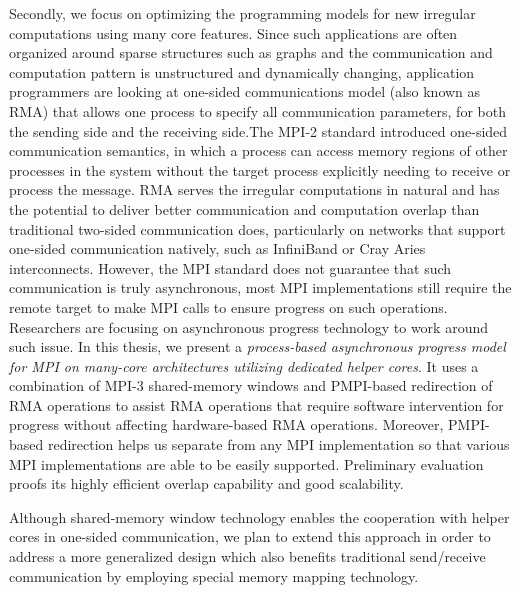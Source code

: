 Secondly, we focus on optimizing the programming models for new irregular 
computations using many core features. Since such applications are often 
organized around sparse structures such as graphs and the communication 
and computation pattern is unstructured and dynamically changing, application 
programmers are looking at one-sided communications model (also known as 
RMA) that allows one process to specify all communication parameters, 
for both the sending side and the receiving side.The MPI-2 standard 
introduced one-sided communication semantics, in which a process can access 
memory regions of other processes in the system without the target process 
explicitly needing to receive or process the message. RMA serves the 
irregular computations in natural and has the potential to deliver better 
communication and computation overlap than traditional two-sided communication 
does, particularly on networks that support one-sided communication natively, 
such as InfiniBand or Cray Aries interconnects. However, the MPI standard 
does not guarantee that such communication is truly asynchronous, most 
MPI implementations still require the remote target to make MPI calls to 
ensure progress on such operations. Researchers are focusing on asynchronous 
progress technology to work around such issue. In this thesis, we present 
a \textit{process-based asynchronous progress model for MPI on many-core 
architectures utilizing dedicated helper cores}. It uses a combination 
of MPI-3 shared-memory windows and PMPI-based redirection of RMA operations 
to assist RMA operations that require software intervention for progress 
without affecting hardware-based RMA operations. Moreover, PMPI-based 
redirection helps us separate from any MPI implementation so that various 
MPI implementations are able to be easily supported. Preliminary evaluation
proofs its highly efficient overlap capability and good scalability.

Although shared-memory window technology enables the cooperation with 
helper cores in one-sided communication, we plan to extend this approach 
in order to address a more generalized design which also benefits 
traditional send\slash receive communication by employing special memory 
mapping technology.

\clearpage

